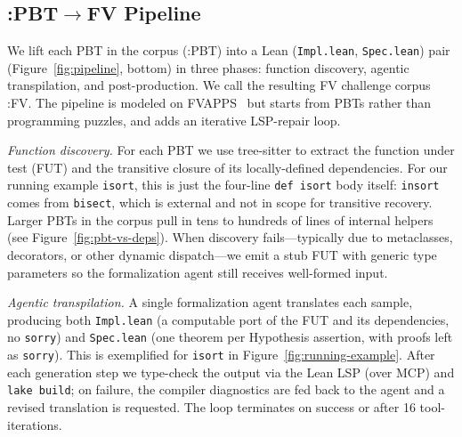 
\subsection{\FVSpec:PBT$\to$FV Pipeline}

We lift each PBT in the  corpus (\FVSpec:PBT) into a Lean
(\texttt{Impl.lean}, \texttt{Spec.lean}) pair (Figure~\ref{fig:pipeline},
bottom) in three phases: function discovery, agentic transpilation, and
post-production.
We call the resulting FV challenge corpus \FVSpec:FV.
 The pipeline is modeled on
FVAPPS~\cite{dougherty2025proving} but starts from PBTs rather
than programming puzzles, and adds an iterative LSP-repair loop.

\emph{Function discovery.}\label{sec:pipeline-discovery}
For each PBT we use tree-sitter to extract the function under test
(FUT) and the transitive closure of its locally-defined dependencies. For
our running example \texttt{isort}, this is just the four-line \texttt{def
isort} body itself: \texttt{insort} comes from \texttt{bisect}, which is
external and not in scope for transitive recovery. Larger PBTs in the
corpus pull in tens to hundreds of lines of internal helpers
(see Figure~\ref{fig:pbt-vs-deps}). When discovery fails---typically due
to metaclasses, decorators, or other dynamic dispatch---we emit a stub
FUT with generic type parameters so the formalization agent still
receives well-formed input.

\emph{Agentic transpilation.} A single formalization agent translates each sample, producing both
\texttt{Impl.lean} (a computable port of the FUT and its dependencies, no
\texttt{sorry}) and \texttt{Spec.lean} (one theorem per Hypothesis
assertion, with proofs left as \texttt{sorry}). This is exemplified for \texttt{isort} in 
Figure~\ref{fig:running-example}.
After each generation step we type-check the output via the Lean LSP
(over MCP) and \texttt{lake build}; on failure, the compiler diagnostics
are fed back to the agent and a revised translation is requested. The
loop terminates on success or after 16 tool-iterations.

